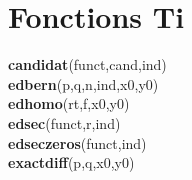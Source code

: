 \section{Fonctions Ti}
\textbf{candidat}(funct,cand,ind)\\
\textbf{edbern}(p,q,n,ind,x0,y0)\\
\textbf{edhomo}(rt,f,x0,y0)\\
\textbf{edsec}(funct,r,ind)\\
\textbf{edseczeros}(funct,ind)\\
\textbf{exactdiff}(p,q,x0,y0)\\
